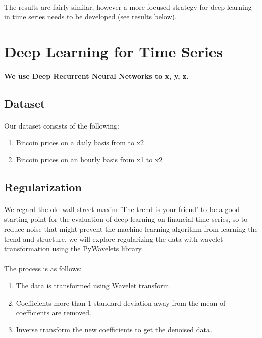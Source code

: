 \documentclass{article}
\begin{document}
\paragraph{}
The results are fairly similar, however a more focused strategy for deep learning in time series needs to be developed (see results below).

\section{Deep Learning for Time Series}
\paragraph{We use Deep Recurrent Neural Networks to x, y, z.}

\subsection{Dataset}
\paragraph{}
Our dataset consists of the following:
\begin{enumerate}
    \item Bitcoin prices on a daily basis from  to x2
    \item Bitcoin prices on an hourly basis from x1 to x2
\end{enumerate}

\subsection{Regularization}
\paragraph{}
We regard the old wall street maxim 'The trend is your friend' to be a good starting point for the evaluation of deep learning on financial time series, so to reduce noise that might prevent the machine learning algorithm from learning the trend and structure, we will explore regularizing the data with wavelet transformation using the \href{https://pywavelets.readthedocs.io/en/latest/#main-features}{PyWavelets library.}

\paragraph{}
The process is as follows:
\begin{enumerate}
\item The data is transformed using Wavelet transform.
\item Coefficients more than 1 standard deviation away from the mean of coefficients are removed.
\item Inverse transform the new coefficients to get the denoised data.
\end{enumerate}
\end{document}
